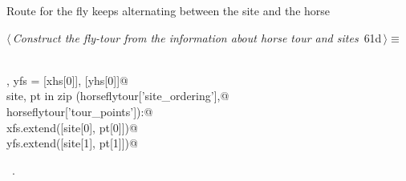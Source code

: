 \documentclass[11.5pt]{report}
\begin{document}
\vspace{-0.8cm} \newchunk Route for the fly  keeps alternating between the site and the horse
\begin{flushleft} \small
\begin{minipage}{\linewidth}\label{scrap86}\raggedright\small
{} $\langle\,${\itshape Construct the fly-tour from the information about horse tour and sites}\nobreak\ {\footnotesize {61d}}$\,\rangle\equiv$
\vspace{-1ex}
\begin{list}{}{} \item
\mbox{}\verb@@\\
\mbox{}\verb@xfs , yfs = [xhs[0]], [yhs[0]]@\\
\mbox{}\verb@for site, pt in zip (horseflytour['site_ordering'],@\\
\mbox{}\verb@                     horseflytour['tour_points']):@\\
\mbox{}\verb@   xfs.extend([site[0], pt[0]])@\\
\mbox{}\verb@   yfs.extend([site[1], pt[1]])@\\
\mbox{}\verb@@{\NWsep}
\end{list}
\vspace{-1.5ex}
\footnotesize
\begin{list}{}{\setlength{\itemsep}{-\parsep}\setlength{\itemindent}{-\leftmargin}}
\item \NWtxtMacroRefIn\ .

\item{}
\end{list}
\end{minipage}\vspace{4ex}
\end{flushleft}
\end{document}
